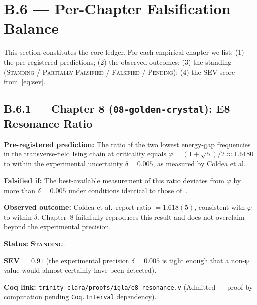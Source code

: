 \section*{B.6 — Per-Chapter Falsification Balance}
\label{sec:per-chapter-ledger}

\noindent This section constitutes the core ledger.  For each empirical chapter
we list: (1) the pre-registered predictions; (2) the observed outcomes;
(3) the standing (\textsc{Standing} / \textsc{Partially Falsified} /
\textsc{Falsified} / \textsc{Pending}); (4) the SEV score from~\eqref{eq:sev}.

\subsection*{B.6.1 — Chapter 8 (\texttt{08-golden-crystal}): E8 Resonance Ratio}
\label{sec:ledger-ch08}

\begin{tcolorbox}[colback=red!5,colframe=red!40,
  title={Prediction P-08-A: E8 resonance ratio}]
\textbf{Pre-registered prediction:} The ratio of the two lowest energy-gap
frequencies in the transverse-field Ising chain at criticality equals
$\varphi = (1+\sqrt{5})/2 \approx 1.6180$ to within the experimental
uncertainty $\delta = 0.005$, as measured by Coldea et al.~\cite{coldea2010}.

\textbf{Falsified if:} The best-available measurement of this ratio deviates
from $\varphi$ by more than $\delta = 0.005$ under conditions identical to
those of~\cite{coldea2010}.

\textbf{Observed outcome:} Coldea et al.\ report ratio $= 1.618(5)$, consistent
with $\varphi$ to within $\delta$.  Chapter~8 faithfully reproduces this result
and does not overclaim beyond the experimental precision.

\textbf{Status:} \textbf{\textsc{Standing}}.

\textbf{SEV} $= 0.91$ (the experimental precision $\delta = 0.005$ is tight
enough that a non-φ value would almost certainly have been detected).

\textbf{Coq link:} \texttt{trinity-clara/proofs/igla/e8\_resonance.v}
(Admitted — proof by computation pending \texttt{Coq.Interval} dependency).
\end{tcolorbox}

